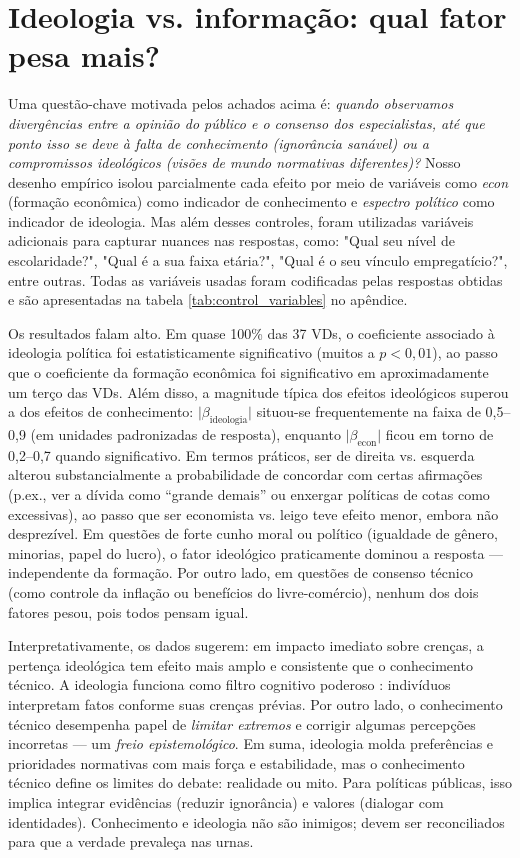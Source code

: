 \section{Ideologia vs. informação: qual fator pesa mais?}

Uma questão-chave motivada pelos achados acima é: \emph{quando observamos divergências entre a opinião do público e o consenso dos especialistas, até que ponto isso se deve à falta de conhecimento (ignorância sanável) ou a compromissos ideológicos (visões de mundo normativas diferentes)?} Nosso desenho empírico isolou parcialmente cada efeito por meio de variáveis como \emph{econ} (formação econômica) como indicador de conhecimento e \emph{espectro político} como indicador de ideologia. Mas além desses controles, foram utilizadas variáveis adicionais para capturar nuances nas respostas, como: "Qual seu nível de escolaridade?", "Qual é a sua faixa etária?", "Qual é o seu vínculo empregatício?", entre outras. Todas as variáveis usadas foram codificadas pelas respostas obtidas e são apresentadas na tabela \ref{tab:control_variables} no apêndice.

Os resultados falam alto. Em quase 100\% das 37 VDs, o coeficiente associado à ideologia política foi estatisticamente significativo (muitos a $p<0{,}01$), ao passo que o coeficiente da formação econômica foi significativo em aproximadamente um terço das VDs. Além disso, a magnitude típica dos efeitos ideológicos superou a dos efeitos de conhecimento: $\lvert \beta_{\text{ideologia}} \rvert$ situou-se frequentemente na faixa de 0{,}5–0{,}9 (em unidades padronizadas de resposta), enquanto $\lvert \beta_{\text{econ}} \rvert$ ficou em torno de 0{,}2–0{,}7 quando significativo. Em termos práticos, ser de direita vs. esquerda alterou substancialmente a probabilidade de concordar com certas afirmações (p.ex., ver a dívida como “grande demais” ou enxergar políticas de cotas como excessivas), ao passo que ser economista vs. leigo teve efeito menor, embora não desprezível. Em questões de forte cunho moral ou político (igualdade de gênero, minorias, papel do lucro), o fator ideológico praticamente dominou a resposta — independente da formação. Por outro lado, em questões de consenso técnico (como controle da inflação ou benefícios do livre-comércio), nenhum dos dois fatores pesou, pois todos pensam igual.

Interpretativamente, os dados sugerem: em impacto imediato sobre crenças, a pertença ideológica tem efeito mais amplo e consistente que o conhecimento técnico. A ideologia funciona como filtro cognitivo poderoso \cite{westen2007political}: indivíduos interpretam fatos conforme suas crenças prévias. Por outro lado, o conhecimento técnico desempenha papel de \emph{limitar extremos} e corrigir algumas percepções incorretas — um \emph{freio epistemológico}. Em suma, ideologia molda preferências e prioridades normativas com mais força e estabilidade, mas o conhecimento técnico define os limites do debate: realidade ou mito. Para políticas públicas, isso implica integrar evidências (reduzir ignorância) e valores (dialogar com identidades). Conhecimento e ideologia não são inimigos; devem ser reconciliados para que a verdade prevaleça nas urnas.

